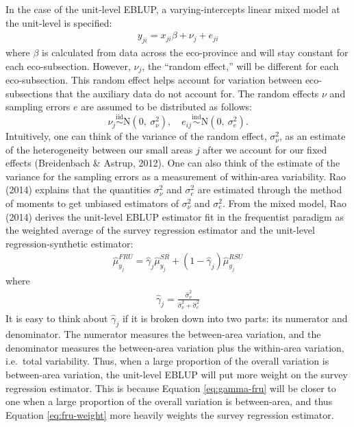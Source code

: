 \documentclass[12pt,twoside]{reedthesis}
\begin{document}
In the case of the unit-level EBLUP, a varying-intercepts linear mixed model at the unit-level is specified:
\begin{align}
y_{ji} = x_{ji} \beta + \nu_j + e_{ji} \label{eq:unit-mod}
\end{align}
where \(\beta\) is calculated from data across the eco-province and will stay constant for each eco-subsection. However, \(\nu_j\), the ``random effect,'' will be different for each eco-subsection. This random effect helps account for variation between eco-subsections that the auxiliary data do not account for. The random effects \(\nu\) and sampling errors \(e\) are assumed to be distributed as follows:
\[
 \newcommand\myeq{\stackrel{\mathclap{\normalfont\mbox{s}}}{~}}
\nu_j \stackrel{\text{iid}}{\sim} \text{N}(0,~ \sigma^2_{\nu}), \quad
e_{ij} \stackrel{\text{ind}}{\sim}\text{N}(0,~ \sigma^2_e).
\]
Intuitively, one can think of the variance of the random effect, \(\sigma^2_\nu\), as an estimate of the heterogeneity between our small areas \(j\) after we account for our fixed effects (Breidenbach \& Astrup, 2012). One can also think of the estimate of the variance for the sampling errors as a measurement of within-area variability. Rao (2014) explains that the quantities \(\sigma^2_\nu\) and \(\sigma^2_e\) are estimated through the method of moments to get unbiased estimators of \(\sigma^2_\nu\) and \(\sigma^2_e\). From the mixed model, Rao (2014) derives the unit-level EBLUP estimator fit in the frequentist paradigm as the weighted average of the survey regression estimator and the unit-level regression-synthetic estimator:
\begin{align}
\hat \mu_{y_j}^{FRU} = \hat \gamma_j \hat\mu_{y_j}^{SR} + (1 - \hat \gamma_j) \hat\mu_{y_j}^{RSU} \label{eq:fru-weight}
\end{align}
where
\begin{align}
\hat\gamma_j = \frac{\hat\sigma^2_\nu}{\hat\sigma^2_\nu + \hat\sigma^2_e} \label{eq:gamma-fru}
\end{align}
It is easy to think about \(\hat\gamma_j\) if it is broken down into two parts: its numerator and denominator. The numerator measures the between-area variation, and the denominator measures the between-area variation plus the within-area variation, i.e.~total variability. Thus, when a large proportion of the overall variation is between-area variation, the unit-level EBLUP will put more weight on the survey regression estimator. This is because Equation \eqref{eq:gamma-fru} will be closer to one when a large proportion of the overall variation is between-area, and thus Equation \eqref{eq:fru-weight} more heavily weights the survey regression estimator.
\end{document}
